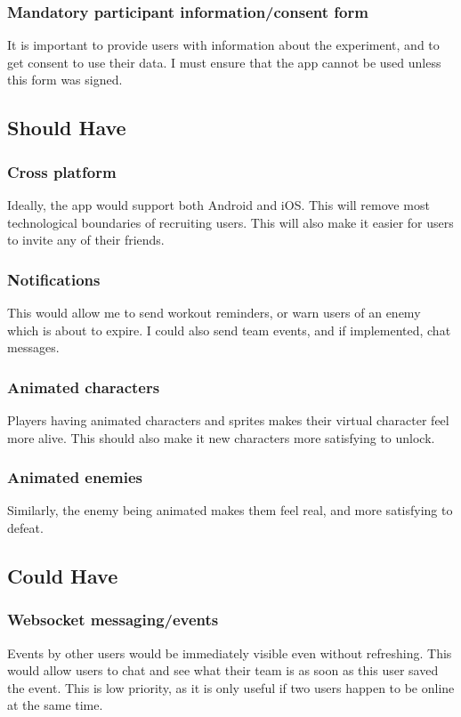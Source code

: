 \documentclass{l4proj}
\begin{document}
  \subsubsection{Mandatory participant information/consent form }
  It is important to provide users with information about the experiment, and to get consent to use their data. I must ensure that the app cannot be used unless this form was signed.

\subsection{Should Have}
  \subsubsection{Cross platform} 
  Ideally, the app would support both Android and iOS. This will remove most technological boundaries of recruiting users. This will also make it easier for users to invite any of their friends. 

  \subsubsection{Notifications} 
  This would allow me to send workout reminders, or warn users of an enemy which is about to expire. I could also send team events, and if implemented, chat messages.

  \subsubsection{Animated characters}
  Players having animated characters and sprites makes their virtual character feel more alive. This should also make it new characters more satisfying to unlock.

  \subsubsection{Animated enemies}
  Similarly, the enemy being animated makes them feel real, and more satisfying to defeat.

\subsection{Could Have}
  \subsubsection{Websocket messaging/events}
  Events by other users would be immediately visible even without refreshing. This would allow users to chat and see what their team is as soon as this user saved the event. This is low priority, as it is only useful if two users happen to be online at the same time.
\end{document}
